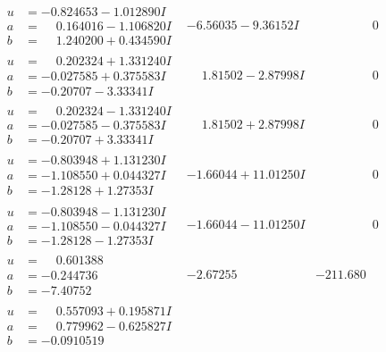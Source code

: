 \documentclass[1p]{elsarticle_modified}
\theoremstyle{definition}
\begin{document}
$$\begin{array}{c|c|c}
\begin{aligned}
u &= -0.824653 - 1.012890 I \\
a &= \phantom{-}0.164016 - 1.106820 I \\
b &= \phantom{-}1.240200 + 0.434590 I\end{aligned}
 & -6.56035 - 9.36152 I & \phantom{-0.000000 } 0 \\ \hline\begin{aligned}
u &= \phantom{-}0.202324 + 1.331240 I \\
a &= -0.027585 + 0.375583 I \\
b &= -0.20707 - 3.33341 I\end{aligned}
 & \phantom{-}1.81502 - 2.87998 I & \phantom{-0.000000 } 0 \\ \hline\begin{aligned}
u &= \phantom{-}0.202324 - 1.331240 I \\
a &= -0.027585 - 0.375583 I \\
b &= -0.20707 + 3.33341 I\end{aligned}
 & \phantom{-}1.81502 + 2.87998 I & \phantom{-0.000000 } 0 \\ \hline\begin{aligned}
u &= -0.803948 + 1.131230 I \\
a &= -1.108550 + 0.044327 I \\
b &= -1.28128 + 1.27353 I\end{aligned}
 & -1.66044 + 11.01250 I & \phantom{-0.000000 } 0 \\ \hline\begin{aligned}
u &= -0.803948 - 1.131230 I \\
a &= -1.108550 - 0.044327 I \\
b &= -1.28128 - 1.27353 I\end{aligned}
 & -1.66044 - 11.01250 I & \phantom{-0.000000 } 0 \\ \hline\begin{aligned}
u &= \phantom{-}0.601388\phantom{ +0.000000I} \\
a &= -0.244736\phantom{ +0.000000I} \\
b &= -7.40752\phantom{ +0.000000I}\end{aligned}
 & -2.67255\phantom{ +0.000000I} & -211.680\phantom{ +0.000000I} \\ \hline\begin{aligned}
u &= \phantom{-}0.557093 + 0.195871 I \\
a &= \phantom{-}0.779962 - 0.625827 I \\
b &= -0.0910519\phantom{ +0.000000I}\end{aligned}

\end{array}$$
\end{document}
